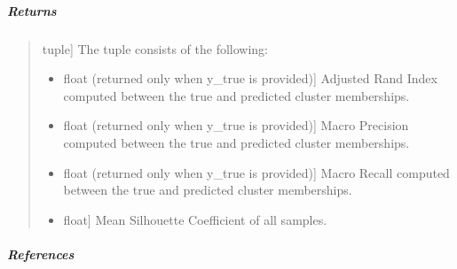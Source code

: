 \documentclass[letterpaper,10pt,english,openany,oneside]{sphinxmanual}
\begin{document}
{{{{\begin{fulllineitems}
\begin{quote}
\begin{description}
\end{description}
\end{quote}


\subparagraph{Returns}
\label{\detokenize{api_reference/generated/QuadratiK.spherical_clustering.PKBC:id6}}\begin{quote}
\begin{description}
\sphinxlineitem{validation metrics}{[}tuple{]}
\sphinxAtStartPar
The tuple consists of the following:
\begin{itemize}
\item {} \begin{description}
\sphinxlineitem{Adjusted Rand Index}{[}float (returned only when y\_true is provided){]}
\sphinxAtStartPar
Adjusted Rand Index computed between the true and predicted cluster memberships.

\end{description}

\item {} \begin{description}
\sphinxlineitem{Macro Precision}{[}float (returned only when y\_true is provided){]}
\sphinxAtStartPar
Macro Precision computed between the true and predicted cluster memberships.

\end{description}

\item {} \begin{description}
\sphinxlineitem{Macro Recall}{[}float (returned only when y\_true is provided){]}
\sphinxAtStartPar
Macro Recall computed between the true and predicted cluster memberships.

\end{description}

\item {} \begin{description}
\sphinxlineitem{Average Silhouette Score}{[}float{]}
\sphinxAtStartPar
Mean Silhouette Coefficient of all samples.

\end{description}

\end{itemize}

\end{description}
\end{quote}


\subparagraph{References}
\label{\detokenize{api_reference/generated/QuadratiK.spherical_clustering.PKBC:id7}}\begin{quote}


\end{quote}
\end{fulllineitems}}}}}
\end{document}
